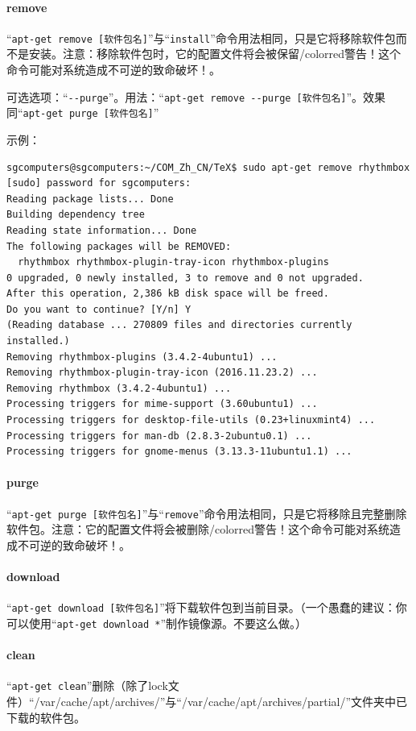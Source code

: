\paragraph{remove}
“\verb|apt-get remove [软件包名]|”与“\verb|install|”命令用法相同，只是它将移除软件包而不是安装。注意：移除软件包时，它的配置文件将会被保留{/color{red}警告！这个命令可能对系统造成不可逆的致命破坏！}。\par
可选选项：“\verb|--purge|”。用法：“\verb|apt-get remove --purge [软件包名]|”。效果同“\verb|apt-get purge [软件包名]|”\par
示例：
\begin{verbatim}
sgcomputers@sgcomputers:~/COM_Zh_CN/TeX$ sudo apt-get remove rhythmbox
[sudo] password for sgcomputers: 
Reading package lists... Done
Building dependency tree       
Reading state information... Done
The following packages will be REMOVED:
  rhythmbox rhythmbox-plugin-tray-icon rhythmbox-plugins
0 upgraded, 0 newly installed, 3 to remove and 0 not upgraded.
After this operation, 2,386 kB disk space will be freed.
Do you want to continue? [Y/n] Y
(Reading database ... 270809 files and directories currently installed.)
Removing rhythmbox-plugins (3.4.2-4ubuntu1) ...
Removing rhythmbox-plugin-tray-icon (2016.11.23.2) ...
Removing rhythmbox (3.4.2-4ubuntu1) ...
Processing triggers for mime-support (3.60ubuntu1) ...
Processing triggers for desktop-file-utils (0.23+linuxmint4) ...
Processing triggers for man-db (2.8.3-2ubuntu0.1) ...
Processing triggers for gnome-menus (3.13.3-11ubuntu1.1) ...
\end{verbatim}
\paragraph{purge}
“\verb|apt-get purge [软件包名]|”与“\verb|remove|”命令用法相同，只是它将移除且完整删除软件包。注意：它的配置文件将会被删除{/color{red}警告！这个命令可能对系统造成不可逆的致命破坏！}。\par
\paragraph{ download}
“\verb|apt-get download [软件包名]|”将下载软件包到当前目录。（一个愚蠢的建议：你可以使用“\verb|apt-get download *|”制作镜像源。{\color{red}不要这么做。}）
\paragraph{clean}
“\verb|apt-get clean|”删除（除了lock文件）“/var/cache/apt/archives/”与“/var/cache/apt/archives/partial/”文件夹中已下载的软件包。
